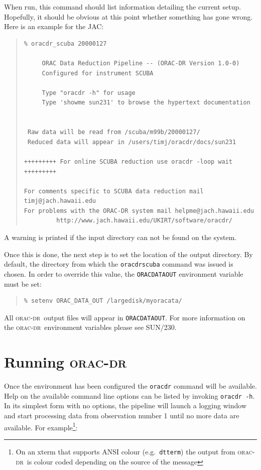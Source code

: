 \documentclass[twoside,11pt]{article}
\newcommand{\xref}[3]{#1}
\newcommand{\xlabel}[1]{}
\renewcommand{\_}{\texttt{\symbol{95}}}
\newcommand{\oracdr}{\xref{\textsc{orac-dr}}{sun230}{}}
\newenvironment{myquote}{\begin{quote}\begin{small}}{\end{small}\end{quote}}
\begin{document}
When run, this command should list information detailing the
current setup. Hopefully, it should be obvious at this point
whether something has gone wrong. Here is an example for the JAC:

\begin{myquote}
\begin{verbatim}
% oracdr_scuba 20000127
 
     ORAC Data Reduction Pipeline -- (ORAC-DR Version 1.0-0)
     Configured for instrument SCUBA
 
     Type "oracdr -h" for usage
     Type 'showme sun231' to browse the hypertext documentation
 
 
 Raw data will be read from /scuba/m99b/20000127/
 Reduced data will appear in /users/timj/oracdr/docs/sun231
 
+++++++++ For online SCUBA reduction use oracdr -loop wait +++++++++

For comments specific to SCUBA data reduction mail timj@jach.hawaii.edu
For problems with the ORAC-DR system mail helpme@jach.hawaii.edu
         http://www.jach.hawaii.edu/UKIRT/software/oracdr/

\end{verbatim}
\end{myquote}

A warning is printed if the input directory can not be found
on the system.

Once this is done, the next step is to set the location of the
output directory. By default, the directory from which the
\texttt{oracdr\_scuba} command was issued is chosen. In order
to override this value, the \texttt{ORAC\_DATA\_OUT} environment
variable must be set:

\begin{myquote}
\begin{verbatim}
% setenv ORAC_DATA_OUT /largedisk/myoracata/
\end{verbatim}
\end{myquote}

All \oracdr\ output files will appear in \texttt{ORAC\_DATA\_OUT}.
For more information on the \oracdr\ environment variables please
see \xref{SUN/230}{sun230}{shell_variables}.

\section{Running \oracdr\xlabel{running_orac_dr}}

Once the environment has been configured the \texttt{oracdr} command
will be available. Help on the available command line options 
can be listed by invoking \texttt{oracdr -h}. In its simplest
form with no options, the pipeline will launch a logging window and 
start processing data from observation number 1 until no more data are
available. For example\footnote{On an xterm that supports ANSI colour (e.g.\
\texttt{dtterm}) the output from \oracdr\ is colour coded depending on the
source of the message}:
\end{document}
